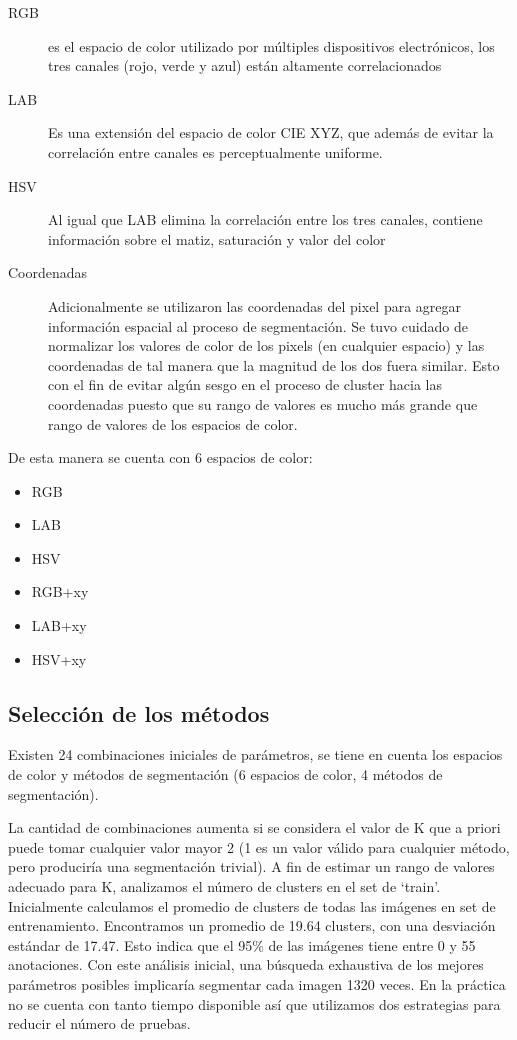 \documentclass[10pt,twocolumn,letterpaper]{article}
\begin{document}
\begin{description}
\item[RGB] es el espacio de color utilizado por múltiples dispositivos electrónicos, los tres canales (rojo, verde y azul) están altamente correlacionados \cite{Forsyth2002}
\item[LAB] Es una extensión del espacio de color CIE XYZ, que además de evitar la correlación entre canales es perceptualmente uniforme.\cite{Forsyth2002}
\item[HSV] Al igual que LAB elimina la correlación entre los tres canales,  contiene información sobre el matiz, saturación y valor del color\cite{Forsyth2002}
\item[Coordenadas] Adicionalmente se utilizaron las coordenadas del pixel para agregar información espacial al proceso de segmentación.  Se tuvo cuidado de  normalizar los valores de color de los pixels (en cualquier espacio) y las coordenadas de tal manera que la magnitud de los dos fuera similar. Esto con el fin de evitar algún sesgo en el proceso de cluster hacia las coordenadas puesto que su rango de valores es mucho más grande que rango de valores de los espacios de color.
\end{description}
De esta manera se cuenta con 6 espacios de color:

\begin{itemize}
\item RGB
\item LAB
\item HSV
\item RGB+xy
\item LAB+xy
\item HSV+xy
\end{itemize}


\subsection{Selección de los métodos}

Existen 24 combinaciones iniciales de parámetros, se tiene en cuenta los espacios de color y métodos de segmentación (6 espacios de color, 4 métodos de segmentación).

La cantidad de combinaciones aumenta si se considera  el valor de K que a priori puede tomar cualquier valor mayor 2 (1 es un valor válido para cualquier método, pero produciría una segmentación trivial). A fin de estimar un rango de valores adecuado para K, analizamos el número de clusters en el set de ‘train’. Inicialmente calculamos el promedio de clusters de todas las imágenes en set de entrenamiento. Encontramos un promedio de 19.64 clusters, con una desviación estándar de 17.47. Esto indica que el 95\% de las imágenes tiene entre 0 y 55 anotaciones. Con este análisis inicial, una búsqueda exhaustiva de los mejores parámetros posibles implicaría segmentar cada imagen  1320 veces.  En la práctica no se cuenta con tanto tiempo disponible así que utilizamos dos estrategias para reducir el número de pruebas.
\end{document}
